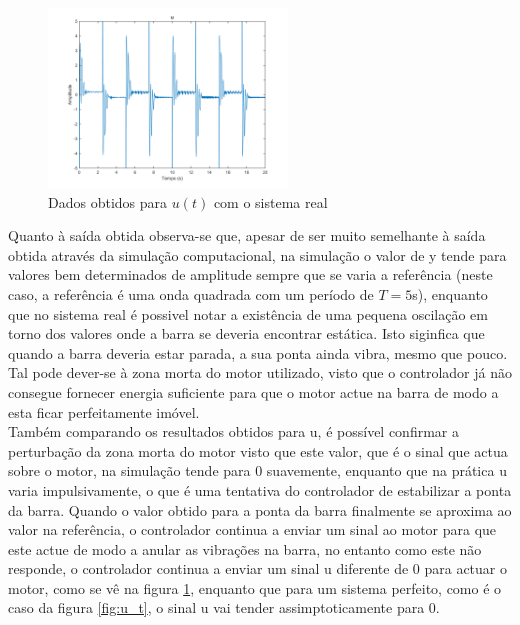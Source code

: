 \documentclass[%
  reprint,
  nofootinbib,
  amsmath,amssymb,
  aps,
  10pt,
  a4paper
]{revtex4-1}
\begin{document}
\begin{figure}[H]
\includegraphics[width=2.5in]{../img/u_dados_01.png}
\caption{Dados obtidos para $u(t)$ com o sistema real}
\label{fig:u_d}
\end{figure}
Quanto à saída obtida observa-se que, apesar de ser muito semelhante à saída obtida através da simulação computacional, na simulação o valor de y tende para valores bem determinados de amplitude sempre que se varia a referência (neste caso, a referência é uma onda quadrada com um período de $T=5$s), enquanto que no sistema real é possivel notar a existência de uma pequena oscilação em torno dos valores onde a barra se deveria encontrar estática. Isto siginfica que quando a barra deveria estar parada, a sua ponta ainda vibra, mesmo que pouco. Tal pode dever-se à zona morta do motor utilizado, visto que o controlador já não consegue fornecer energia suficiente para que o motor actue na barra de modo a esta ficar perfeitamente imóvel.\\
Também comparando os resultados obtidos para u, é possível confirmar a perturbação da zona morta do motor visto que este valor, que é o sinal que actua sobre o motor,  na simulação tende para 0 suavemente, enquanto que na prática u varia impulsivamente, o que é uma tentativa do controlador de estabilizar a ponta da barra. Quando o valor obtido para a ponta da barra finalmente se aproxima ao valor na referência, o controlador continua a enviar um sinal ao motor para que este actue de modo a anular as vibrações na barra, no entanto como este não responde, o controlador continua a enviar um sinal u diferente de 0 para actuar o motor, como se vê na figura \ref{fig:u_d}, enquanto que para um sistema perfeito, como é o caso da figura \ref{fig:u_t}, o sinal u vai tender assimptoticamente para 0.
\end{document}
